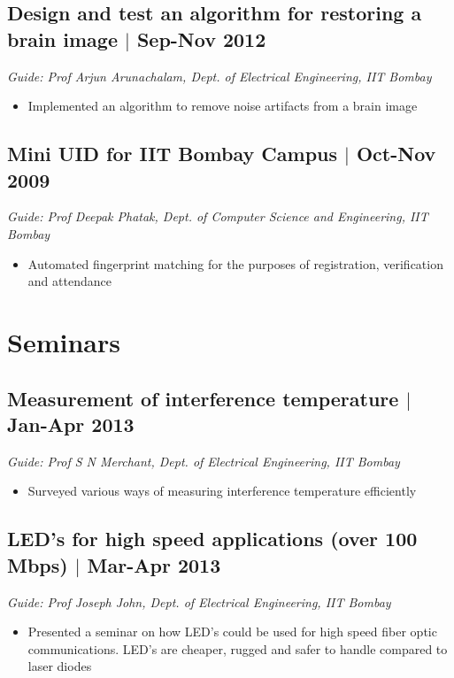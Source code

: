 \documentclass[11pt]{article}
\begin{document}
\subsection*{Design and test an algorithm for restoring a brain image $\vert$  Sep-Nov 2012}
\emph{Guide: Prof Arjun Arunachalam, Dept. of Electrical Engineering, IIT Bombay}  
\begin{itemize}
\item Implemented an algorithm to remove noise artifacts from a brain image  
\end{itemize}

\subsection*{Mini UID for IIT Bombay Campus $\vert$  Oct-Nov 2009}
\emph{Guide: Prof Deepak Phatak, Dept. of Computer Science and Engineering, IIT Bombay} 
\begin{itemize}
\item Automated fingerprint matching for the purposes of registration, verification and attendance 
\end{itemize}

\section*{Seminars}
\subsection*{Measurement of interference temperature $\vert$  Jan-Apr 2013} 
\emph{Guide: Prof S N Merchant, Dept. of Electrical Engineering, IIT Bombay}
\begin{itemize}  
\item Surveyed various ways of measuring interference temperature efficiently 
\end{itemize}
  
\subsection*{LED's for high speed applications (over 100 Mbps) $\vert$  Mar-Apr 2013}
\emph{Guide: Prof Joseph John, Dept. of Electrical Engineering, IIT Bombay}  
\begin{itemize}  
\item Presented a seminar on how LED's could be used for high speed fiber optic communications. LED's are cheaper, rugged and safer to handle compared to laser diodes 
\end{itemize}
\end{document}
